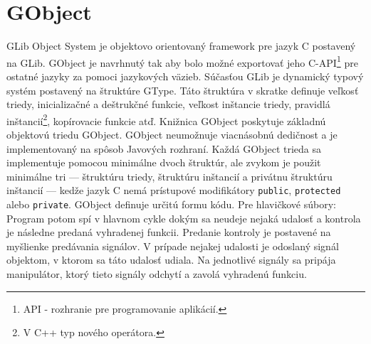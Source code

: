 \documentclass[12pt,oneside,final]{fithesis2}
\begin{document}
\section{GObject}
GLib Object System je objektovo orientovaný framework pre jazyk C postavený na GLib. GObject je navrhnutý tak aby bolo možné exportovať jeho C-API\footnote{API - rozhranie pre programovanie aplikácií.} pre ostatné jazyky za pomoci jazykových väzieb. Súčasťou GLib je dynamický typový systém postavený na štruktúre GType. Táto štruktúra v skratke definuje veľkosť triedy, inicializačné a deštrukčné funkcie, veľkost inštancie triedy, pravidlá inštancií\footnote{V C++ typ nového operátora.}, kopírovacie funkcie atď. Knižnica GObject poskytuje základnú objektovú triedu GObject. GObject neumožnuje viacnásobnú dedičnost a je implementovaný na spôsob Javových rozhraní. Každá GObject trieda sa implementuje pomocou minimálne dvoch štruktúr, ale zvykom je použit minimálne tri --- štruktúru triedy, štruktúru inštancií a privátnu štruktúru inštancií --- kedže jazyk C nemá prístupové modifikátory \verb|public|, \verb|protected| alebo \verb|private|. GObject definuje určitú formu kódu.
Pre hlavičkové súbory: %
Program potom spí v hlavnom cykle dokým sa neudeje nejaká udalosť a kontrola je následne predaná vyhradenej funkcii. Predanie kontroly je postavené na myšlienke predávania signálov. V prípade nejakej udalosti je odoslaný signál objektom, v ktorom sa táto udalosť udiala. Na jednotlivé signály sa pripája manipulátor, ktorý tieto signály odchytí a zavolá vyhradenú funkciu. 
\end{document}
